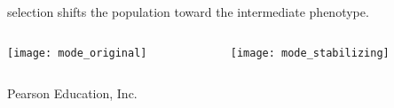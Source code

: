\documentclass[t,handout]{beamer}  %
\begin{document}
%
\begin{frame}{ selection shifts the population toward the intermediate phenotype.}
	\centering
	\begin{columns}[T]
		\begin{column}{0.5\textwidth}
			\centering
			\texttt{[image: mode\_original]}
		\end{column}
		\begin{column}{0.5\textwidth}
			\texttt{[image: mode\_stabilizing]}
		\end{column}
	\end{columns}
\end{frame}
%
{
\begin{frame}[b]{}

\tiny\textcopyright Pearson Education, Inc.
\end{frame}
}
\end{document}

